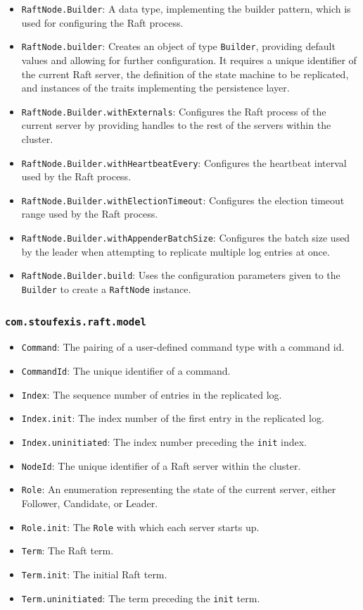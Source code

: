 \begin{itemize}
    \item \lstinline|RaftNode.Builder|: A data type, implementing the builder pattern, which is used for configuring the Raft process.
    \item \lstinline|RaftNode.builder|: Creates an object of type \lstinline|Builder|, providing default values and allowing for further configuration. It requires a unique identifier of the current Raft server, the definition of the state machine to be replicated, and instances of the traits implementing the persistence layer.
    \item \lstinline|RaftNode.Builder.withExternals|: Configures the Raft process of the current server by providing handles to the rest of the servers within the cluster.
    \item \lstinline|RaftNode.Builder.withHeartbeatEvery|: Configures the heartbeat interval used by the Raft process.
    \item \lstinline|RaftNode.Builder.withElectionTimeout|: Configures the election timeout range used by the Raft process.
    \item \lstinline|RaftNode.Builder.withAppenderBatchSize|: Configures the batch size used by the leader when attempting to replicate multiple log entries at once.
    \item \lstinline|RaftNode.Builder.build|: Uses the configuration parameters given to the \lstinline|Builder| to create a \lstinline|RaftNode| instance.
\end{itemize}

\subsubsection{\lstinline|com.stoufexis.raft.model|}

\begin{itemize}
    \item \lstinline|Command|: The pairing of a user-defined command type with a command id.
    \item \lstinline|CommandId|: The unique identifier of a command.
    \item \lstinline|Index|: The sequence number of entries in the replicated log.
    \item \lstinline|Index.init|: The index number of the first entry in the replicated log.
    \item \lstinline|Index.uninitiated|: The index number preceding the \lstinline|init| index.
    \item \lstinline|NodeId|: The unique identifier of a Raft server within the cluster.
    \item \lstinline|Role|: An enumeration representing the state of the current server, either Follower, Candidate, or Leader.
    \item \lstinline|Role.init|: The \lstinline|Role| with which each server starts up.
    \item \lstinline|Term|: The Raft term.
    \item \lstinline|Term.init|: The initial Raft term.
    \item \lstinline|Term.uninitiated|: The term preceding the \lstinline|init| term.
\end{itemize}

